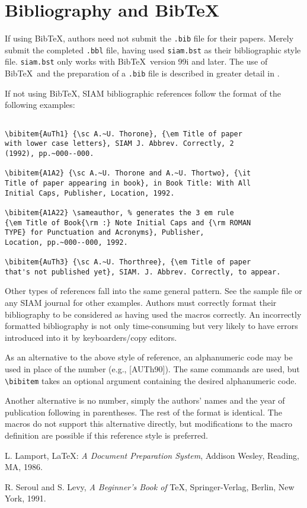 \section{Bibliography and Bib\TeX}

If using Bib\TeX, authors need not submit the {\tt .bib} file for
their papers. Merely submit the completed {\tt .bbl} file, having used
{\tt siam.bst} as their bibliographic style file. {\tt siam.bst}
only works with Bib\TeX\ version 99i and later. The use of
Bib\TeX\ and the preparation of a {\tt .bib} file is
described in greater detail in \cite{Lamport}.

If not using Bib\TeX, SIAM bibliographic references follow
the format of the following examples:

\begin{verbatim}

\bibitem{AuTh1} {\sc A.~U. Thorone}, {\em Title of paper
with lower case letters}, SIAM J. Abbrev. Correctly, 2
(1992), pp.~000--000.

\bibitem{A1A2} {\sc A.~U. Thorone and A.~U. Thortwo}, {\it
Title of paper appearing in book}, in Book Title: With All
Initial Caps, Publisher, Location, 1992.

\bibitem{A1A22} \sameauthor, % generates the 3 em rule
{\em Title of Book{\rm :} Note Initial Caps and {\rm ROMAN
TYPE} for Punctuation and Acronyms}, Publisher,
Location, pp.~000--000, 1992.

\bibitem{AuTh3} {\sc A.~U. Thorthree}, {\em Title of paper
that's not published yet}, SIAM. J. Abbrev. Correctly, to appear.

\end{verbatim}

Other types of references fall into the same general
pattern. See the sample file or any SIAM journal for other
examples. Authors must correctly format their bibliography to
be considered as having used the macros correctly. An incorrectly 
formatted bibliography is not only time-consuming but very
likely to have errors introduced into it by keyboarders/copy editors.

As an alternative to the above style of reference, an alphanumeric
code may be used in place of the number (e.g., [AUTh90]). The same
commands are used, but \verb|\bibitem| takes an optional argument
containing the desired alphanumeric code. 

Another alternative is no number, simply the authors' names and
the year of publication following in parentheses. The rest of the
format is identical. The macros do not support this alternative
directly, but modifications to the macro definition are possible
if this reference style is preferred.



\begin{thebibliography}{1}
 {\sc L. Lamport}, \LaTeX: {\em A Document
Preparation System}, Addison Wesley, Reading, MA, 1986.

 {\sc R. Seroul and S. Levy}, {\em A
Beginner's Book of} \TeX, Springer-Verlag, Berlin, New
York, 1991.
\end{thebibliography}



